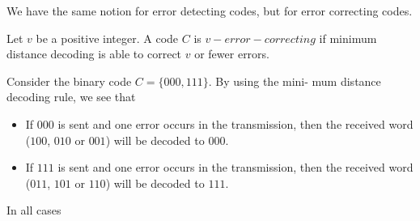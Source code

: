 We have the same notion for error detecting codes, but for error correcting codes.
\begin{definition}
Let $v$ be a positive integer. A code $C$ is $v-error-correcting$
if minimum distance decoding is able to correct $v$ or fewer errors.
\end{definition}

\begin{example}
    Consider the binary code $C = \{000, 111\}$. By using the mini-
mum distance decoding rule, we see that
\begin{itemize}
    \item If $000$ is sent and one error occurs in the transmission, then the received word
    ($100$, $010$ or $001$) will be decoded to $000$.
    \item If $111$ is sent and one error occurs in the transmission, then the received word
    ($011$, $101$ or $110$) will be decoded to $111$.
\end{itemize}

In all cases 

\end{example}